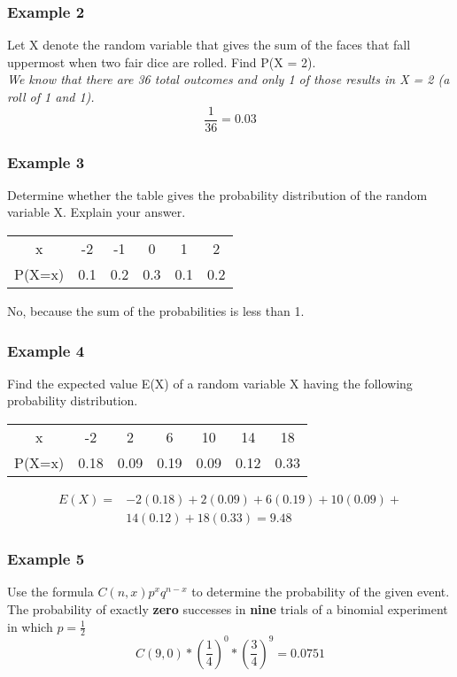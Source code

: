\documentclass[twocolumn]{article}
\newcommand{\bd}{\textbf}
\begin{document}
	\subsubsection*{Example 2}
	Let X denote the random variable that gives the sum of the faces that fall uppermost when two fair dice are rolled. Find P(X = 2). \\
	\emph{We know that there are 36 total outcomes and only 1 of those results in X = 2 (a roll of 1 and 1).}
	\begin{equation*}
		\frac{1}{36} = 0.03
	\end{equation*}
	
	\subsubsection*{Example 3}
	Determine whether the table gives the probability distribution of the random variable X. Explain your answer.
	\begin{center}
		\begin{tabular}{ |c|c|c|c|c|c| }
			\hline
			x & -2 & -1 & 0 & 1 & 2 \\
			P(X=x) & 0.1 & 0.2 & 0.3 & 0.1 & 0.2 \\
			\hline
		\end{tabular}
	\end{center}
	No, because the sum of the probabilities is less than 1.
	
	\subsubsection*{Example 4}
	Find the expected value E(X) of a random variable X having the following probability distribution.
	\begin{center}
		\begin{tabular}{ |c|c|c|c|c|c|c| }
			\hline
			x & -2 & 2 & 6 & 10 & 14 & 18 \\
			P(X=x) & 0.18 & 0.09 & 0.19 & 0.09 & 0.12 & 0.33 \\
			\hline
		\end{tabular}
	\end{center}
	\begin{align*}
		E(X) =& -2(0.18) + 2(0.09) + 6(0.19) + 10(0.09) + \\& 14(0.12) + 18(0.33) = 9.48
	\end{align*}
	
	\subsubsection*{Example 5}
	Use the formula $C(n, x)p^xq^{n-x}$ to determine the probability of the given event. \\
	\indent The probability of exactly \bd{zero} successes in \bd{nine} trials of a binomial experiment in which $p = \frac{1}{2}$
	\begin{equation*}
		C(9, 0) * (\frac{1}{4})^0 * (\frac{3}{4})^9 = 0.0751
	\end{equation*}
	
\end{document}
